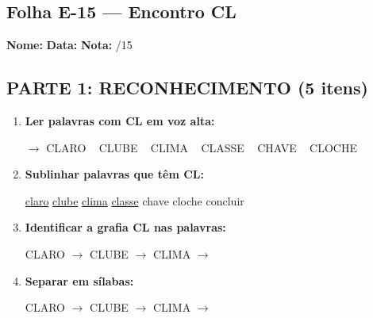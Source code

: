 \subsection{Folha E-15 --- Encontro CL}
\begin{exercicio}



\noindent\textbf{Nome:} \underline{\hspace{3.2cm}} \quad \textbf{Data:} \underline{\hspace{1.6cm}} \quad \textbf{Nota:} \underline{\hspace{0.9cm}}/15


\subsection*{PARTE 1: RECONHECIMENTO (5 itens)}

\begin{enumerate}

  \item \textbf{Ler palavras com CL em voz alta:}
  \begin{center}
  $\rightarrow$ CLARO ~ CLUBE ~ CLIMA ~ CLASSE ~ CHAVE ~ CLOCHE
  \end{center}

  \item \textbf{Sublinhar palavras que têm CL:}

\begin{center}
  \uline{claro} \quad \uline{clube} \quad \uline{clima} \quad \uline{classe} \quad chave \quad cloche \quad concluir
\end{center}

  \item \textbf{Identificar a grafia CL nas palavras:}
  \begin{center}
  CLARO $\rightarrow$ \underline{\hspace{1cm}} \quad CLUBE $\rightarrow$ \underline{\hspace{1cm}} \quad CLIMA $\rightarrow$ \underline{\hspace{1cm}}
  \end{center}

  \item \textbf{Separar em sílabas:}
  \begin{center}
  CLARO $\rightarrow$ \underline{\hspace{1.2cm}} \quad CLUBE $\rightarrow$ \underline{\hspace{1.2cm}} \quad CLIMA $\rightarrow$ \underline{\hspace{1.2cm}}
  \end{center}


\end{enumerate}
\end{exercicio}

